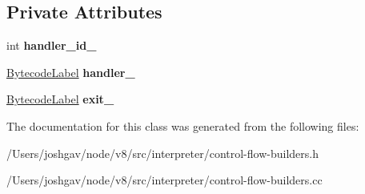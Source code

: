 \subsection*{Private Attributes}
\begin{DoxyCompactItemize}
\item 
int {\bfseries handler\+\_\+id\+\_\+}\hypertarget{classv8_1_1internal_1_1interpreter_1_1_try_catch_builder_a8a2fa106bf2402594d61f19344e78339}{}\label{classv8_1_1internal_1_1interpreter_1_1_try_catch_builder_a8a2fa106bf2402594d61f19344e78339}

\item 
\hyperlink{classv8_1_1internal_1_1interpreter_1_1_bytecode_label}{Bytecode\+Label} {\bfseries handler\+\_\+}\hypertarget{classv8_1_1internal_1_1interpreter_1_1_try_catch_builder_a49ddd1b3f118806acb7bf38a8b294d87}{}\label{classv8_1_1internal_1_1interpreter_1_1_try_catch_builder_a49ddd1b3f118806acb7bf38a8b294d87}

\item 
\hyperlink{classv8_1_1internal_1_1interpreter_1_1_bytecode_label}{Bytecode\+Label} {\bfseries exit\+\_\+}\hypertarget{classv8_1_1internal_1_1interpreter_1_1_try_catch_builder_a4416c22c69e1dd831291eb858eb4518b}{}\label{classv8_1_1internal_1_1interpreter_1_1_try_catch_builder_a4416c22c69e1dd831291eb858eb4518b}

\end{DoxyCompactItemize}


The documentation for this class was generated from the following files\+:\begin{DoxyCompactItemize}
\item 
/\+Users/joshgav/node/v8/src/interpreter/control-\/flow-\/builders.\+h\item 
/\+Users/joshgav/node/v8/src/interpreter/control-\/flow-\/builders.\+cc\end{DoxyCompactItemize}
